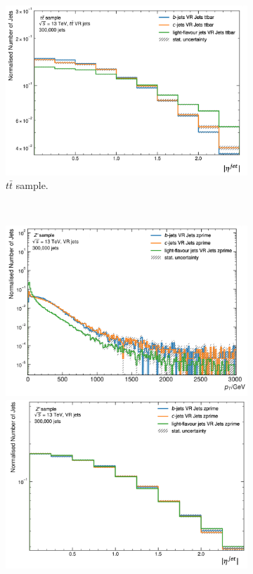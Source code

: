 \begin{figure}[h!]
\begin{subfigure}[b]{0.98\textwidth}
      \includegraphics[scale=0.45]{Images/FTAG/VRDips/JetDist/tteta.png}
      \caption{$t\bar{t}$ sample.} 
      \label{fig:vrjetdistt}
  \end{subfigure}\\
  \begin{subfigure}[b]{0.98\textwidth}
      \centering
      \includegraphics[scale=0.45]{Images/FTAG/VRDips/JetDist/zppt.png}
      \includegraphics[scale=0.45]{Images/FTAG/VRDips/JetDist/zpeta.png}

\end{subfigure}
\end{figure}
